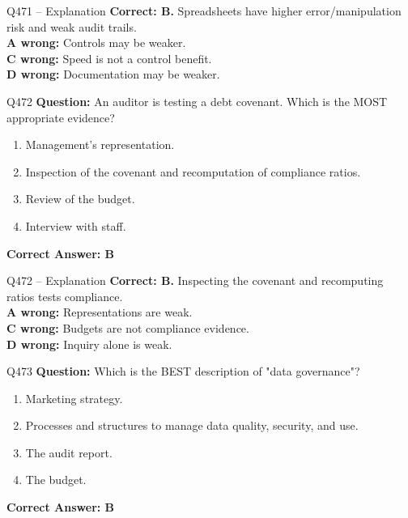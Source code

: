 \documentclass[aspectratio=169,10pt]{beamer}
\begin{document}
	\begin{frame}[t]{Q471 -- Explanation}
		\small
		\textbf{Correct: B.} Spreadsheets have higher error/manipulation risk and weak audit trails. \\[4pt]
		\textbf{A wrong:} Controls may be weaker. \\[2pt]
		\textbf{C wrong:} Speed is not a control benefit. \\[2pt]
		\textbf{D wrong:} Documentation may be weaker.
	\end{frame}
	
	\begin{frame}[t]{Q472}
		\small
		\textbf{Question:} An auditor is testing a debt covenant. Which is the MOST appropriate evidence?
		\begin{enumerate}[label=\Alph*.,itemsep=1pt,topsep=2pt]
			\item Management's representation.
			\item Inspection of the covenant and recomputation of compliance ratios.
			\item Review of the budget.
			\item Interview with staff.
		\end{enumerate}
		\vspace{4pt}
		\textbf{Correct Answer: B}
	\end{frame}
	
	\begin{frame}[t]{Q472 -- Explanation}
		\small
		\textbf{Correct: B.} Inspecting the covenant and recomputing ratios tests compliance. \\[4pt]
		\textbf{A wrong:} Representations are weak. \\[2pt]
		\textbf{C wrong:} Budgets are not compliance evidence. \\[2pt]
		\textbf{D wrong:} Inquiry alone is weak.
	\end{frame}
	
	\begin{frame}[t]{Q473}
		\small
		\textbf{Question:} Which is the BEST description of "data governance"?
		\begin{enumerate}[label=\Alph*.,itemsep=1pt,topsep=2pt]
			\item Marketing strategy.
			\item Processes and structures to manage data quality, security, and use.
			\item The audit report.
			\item The budget.
		\end{enumerate}
		\vspace{4pt}
		\textbf{Correct Answer: B}
	\end{frame}
	
\end{document}
